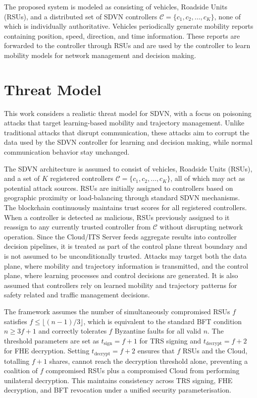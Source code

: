 \documentclass[12pt, a4paper]{report}
\begin{document}
The proposed system is modeled as consisting of vehicles, Roadside Units (RSUs), and a distributed set of SDVN controllers $\mathcal{C} = \{c_1, c_2, \ldots, c_K\}$, none of which is individually authoritative. Vehicles periodically generate mobility reports containing position, speed, direction, and time information. These reports are forwarded to the controller through RSUs and are used by the controller to learn mobility models for network management and decision making.

\section{Threat Model}
\label{sec:threat_model}
This work considers a realistic threat model for SDVN, with a focus on poisoning attacks that target learning-based mobility and trajectory management. Unlike traditional attacks that disrupt communication, these attacks aim to corrupt the data used by the SDVN controller for learning and decision making, while normal communication behavior stay unchanged.

The SDVN architecture is assumed to consist of vehicles, Roadside
Units (RSUs), and a set of $K$ registered controllers
$\mathcal{C} = \{c_1, c_2, \ldots, c_K\}$, all of which may act
as potential attack sources. RSUs are initially assigned to
controllers based on geographic proximity or load-balancing
through standard SDVN mechanisms. The blockchain continuously
maintains trust scores for all registered controllers. When a
controller is detected as malicious, RSUs previously assigned to
it reassign to any currently trusted controller from $\mathcal{C}$
without disrupting network operation. Since the Cloud/ITS Server
feeds aggregate results into controller decision pipelines, it is
treated as part of the control plane threat boundary and is not
assumed to be unconditionally trusted.
Attacks may target both the data plane, where mobility and
trajectory information is transmitted, and the control plane, where
learning processes and control decisions are generated. It is also
assumed that controllers rely on learned mobility and trajectory
patterns for safety related and traffic management decisions.

The framework assumes the number of simultaneously compromised
RSUs $f$ satisfies $f \leq \lfloor (n-1)/3 \rfloor$, which is
equivalent to the standard BFT condition $n \geq 3f+1$ and
correctly tolerates $f$ Byzantine faults for all valid $n$.
The threshold parameters are set as $t_{\mathrm{sign}} = f+1$ for
TRS signing and $t_{\mathrm{decrypt}} = f+2$ for FHE decryption.
Setting $t_{\mathrm{decrypt}} = f+2$ ensures that $f$ RSUs and the
Cloud, totalling $f+1$ shares, cannot reach the decryption threshold
alone, preventing a coalition of $f$ compromised RSUs plus a
compromised Cloud from performing unilateral decryption. This
maintains consistency across TRS signing, FHE decryption, and BFT
revocation under a unified security parameterisation.
\end{document}
